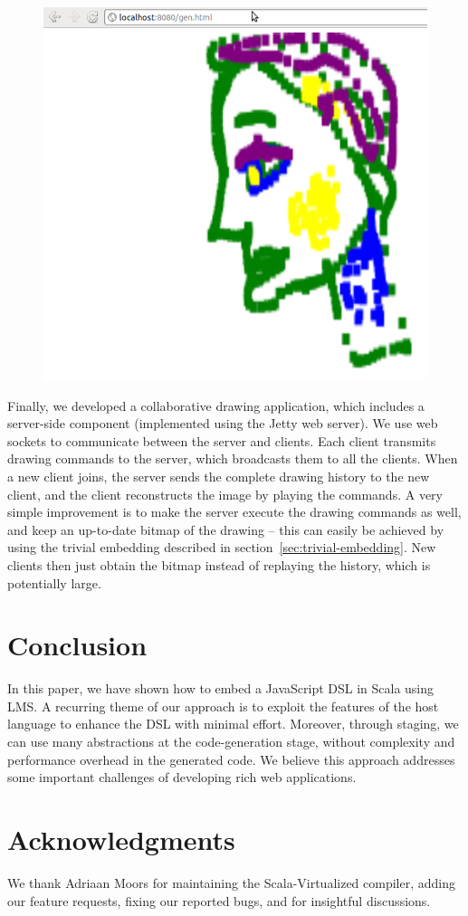 \documentclass[runningheads,a4paper]{llncs}
\begin{document}
\begin{figure}
\includegraphics[scale=0.2]{drawing}
\end{figure}
Finally, we developed a collaborative drawing application, which
includes a server-side component (implemented using the Jetty web
server). We use web sockets to communicate between the server and
clients. Each client transmits drawing commands to the server, which
broadcasts them to all the clients. When a new client joins, the
server sends the complete drawing history to the new client, and the
client reconstructs the image by playing the commands. A very
simple improvement is to make the server execute the drawing
commands as well, and keep an up-to-date bitmap of the drawing -- this
can easily be achieved by using the trivial embedding described in
section~\ref{sec:trivial-embedding}. New clients then just obtain the
bitmap instead of replaying the history, which is potentially large.

\section{Conclusion}\label{sec:conclusion}

In this paper, we have shown how to embed a JavaScript DSL in Scala
using LMS. A recurring theme of our approach is to exploit the
features of the host language to enhance the DSL with minimal
effort. Moreover, through staging, we can use many abstractions at the
code-generation stage, without complexity and performance overhead in
the generated code. We believe this approach addresses some important
challenges of developing rich web applications.

\section{Acknowledgments}
We thank Adriaan Moors for maintaining the Scala-Virtualized compiler, adding our feature requests, fixing our reported bugs, and for insightful discussions.



\end{document}
